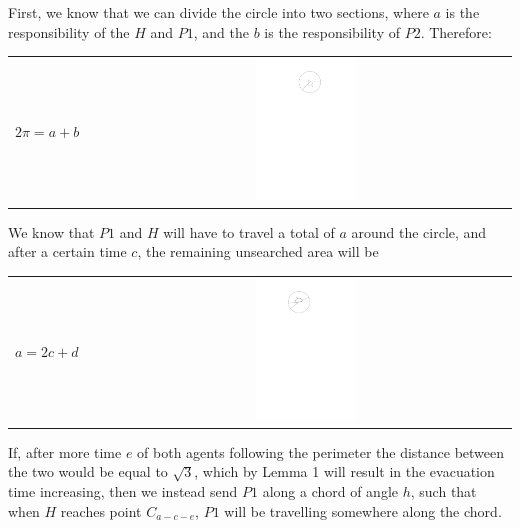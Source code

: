 \documentclass[11pt]{article}
\begin{document}
\begin{flushleft}
    First, we know that we can divide the circle into two sections, where $a$ is the
    responsibility of the $H$ and $P1$, and the $b$ is the responsibility of $P2$.
    Therefore:

    \begin{tabularx}{\textwidth}{lXc}
        \multirow{2}{*}{$2\pi = a+b$} & & \parbox[c]{0.25\textwidth}{\includegraphics[width=0.25\textwidth]{Q2S1_Eq/eq_1.pdf}} \\
    \end{tabularx}

    We know that $P1$ and $H$ will have to travel a total of $a$ around the circle,
    and after a certain time $c$, the remaining unsearched area will be

    \begin{tabularx}{\textwidth}{lXc}
        \multirow{2}{*}{$a = 2c+d$} & & \parbox[c]{0.25\textwidth}{\includegraphics[width=0.25\textwidth]{Q2S1_Eq/eq_2.pdf}} \\
    \end{tabularx}




    If, after more time $e$ of both agents following the perimeter the distance between the two
    would be equal to $\sqrt{3}$, which by Lemma 1 will result in the evacuation time increasing, then
    we instead send $P1$ along a chord of angle $h$, such that when $H$ reaches point $C_{a - c - e}$, $P1$ will be travelling somewhere along the chord.


\end{flushleft}
\end{document}
